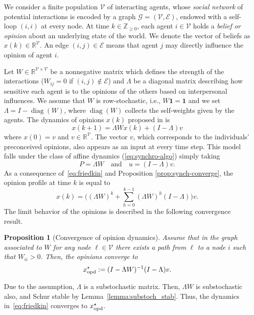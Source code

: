 \documentclass{IEEEtran}
\newtheorem{proposition}{Proposition}
\newcommand{\real}{\mathbb{R}}
\newcommand{\integernonnegative}{\mathbb{Z}_{\ge 0}}
\newcommand{\G}{\mathcal{G}} \newcommand{\V}{\mathcal{V}} \newcommand{\E}{\mathcal{E}}
\newcommand{\1}{\mathbf{1}} \newcommand{\ind}{\mathds{1}}
\newcommand{\diag}{\operatorname{diag}}
\begin{document}
We consider a finite population $\V$ of interacting agents, whose {\it social network} of potential interactions is encoded by a graph $\G=(\V,\E)$, endowed with a self-loop  $(i,i)$ at every node. At time $k\in\integernonnegative$, each agent $i\in\V$ holds a {\it belief or opinion} about an underlying state of the world. We denote the vector of beliefs as $x(k)\in\real^\V$. An edge $(i,j)\in \E$ means that agent $j$ may directly influence the opinion of agent $i$.

Let $W\in \real^{\V\times\V}$ be a nonnegative matrix which defines the strength of the interactions ($W_{ij}=0$ if $(i,j)\not\in \E$) and $\Lambda$ be a diagonal matrix describing how sensitive each agent is to the opinions of the others based on interpersonal influences. We assume that $W$ is row-stochastic, i.e., $W\1=\1$ and we set $\Lambda=I-\diag(W)$, where $\diag(W)$ collects the self-weights given by the agents.
The dynamics of opinions $x(k)$ proposed in \cite{NEF-ECJ:99} is 
\begin{equation}
\label{eq:friedkin}
x(k+1)= \Lambda W x(k) + (I-\Lambda) v
\end{equation}
where $x(0)=v$ and $v\in \real^\V$. The vector $v$, which corresponds to the individuals' preconceived opinions, also appears as an input at every time step. This model falls under the class of 
affine dynamics (\ref{eq:synchro-algo}) simply taking 
\begin{equation}\label{Pu-def-opinions}P=\Lambda W\quad \text{and} \quad u=(I-\Lambda) v.\end{equation}
As a consequence of~\eqref{eq:friedkin} and Proposition \ref{prop:synch-converge}, the opinion profile at time $k$ is equal to 
$$
x(k)=\big ( (\Lambda W)^k +\sum_{h=0}^{k-1} (\Lambda W)^h (I-\Lambda) \big) v.
$$ 
The limit behavior of the opinions is described in the following 
convergence result.

\begin{proposition}[Convergence of opinion dynamics]
\label{prop:convergence-friedkin}
Assume that in the graph
associated to $W$ for any node $\ell\in \V$ there exists a path from
$\ell$ to a node $i$ such that  $W_{ii}>0$. Then, the opinions converge to
$$ {x_{\textup{opd}}^{\star}}:=(I-\Lambda W)^{-1}(I-\Lambda)v.$$
\end{proposition}

\begin{IEEEproof}
Due to the assumption, $\Lambda$ is a substochastic matrix. Then, $\Lambda W$ is substochastic also, and 
Schur stable by Lemma~\ref{lemma:substoch_stab}. Thus, the dynamics in~\eqref{eq:friedkin} converges to $ {x_{\textup{opd}}^{\star}}$. 
\end{IEEEproof}
\end{document}
